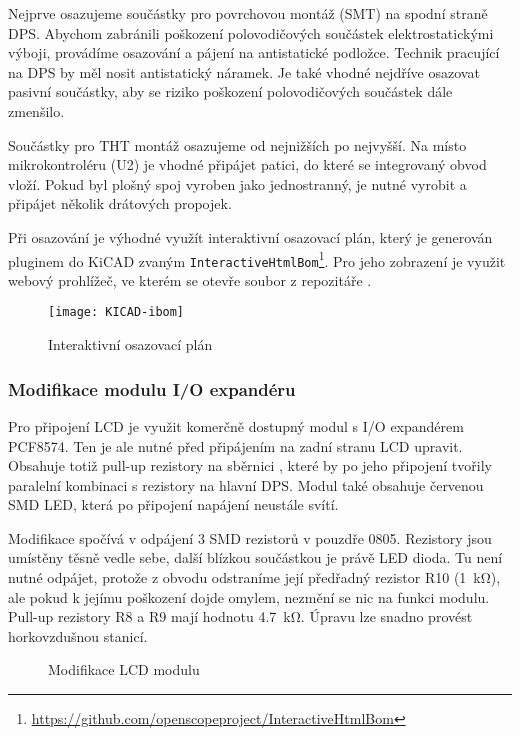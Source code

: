 Nejprve osazujeme součástky pro povrchovou montáž (SMT) na spodní straně DPS.
Abychom zabránili poškození polovodičových součástek elektrostatickými výboji,
provádíme osazování a pájení na antistatické podložce. Technik pracující na DPS
by měl nosit antistatický náramek. Je také vhodné nejdříve osazovat pasivní
součástky, aby se riziko poškození polovodičových součástek dále zmenšilo.

Součástky pro THT montáž osazujeme od nejnižších po nejvyšší. Na místo
mikrokontroléru (U2) je vhodné připájet patici, do které se integrovaný obvod
vloží. Pokud byl plošný spoj vyroben jako jednostranný, je nutné vyrobit
a připájet několik drátových propojek.

Při osazování je výhodné využít interaktivní osazovací plán, který je generován
pluginem do KiCAD zvaným
\texttt{InteractiveHtmlBom}\footnote{\url{https://github.com/openscopeproject/InteractiveHtmlBom}}.
Pro jeho zobrazení je využit webový prohlížeč, ve kterém se otevře soubor
 z repozitáře .

\begin{figure}[htbp]
    \centering
    \texttt{[image: KICAD-ibom]}
    \caption{Interaktivní osazovací plán}
    \label{fig:PCB ibom}
\end{figure}


\subsubsection{Modifikace modulu I/O expandéru}
Pro připojení LCD je využit komerčně dostupný modul s I/O expandérem PCF8574.
Ten je ale nutné před připájením na zadní stranu LCD upravit. Obsahuje totiž
pull-up rezistory na sběrnici \IIC{}, které by po jeho připojení tvořily
paralelní kombinaci s rezistory na hlavní DPS. Modul také obsahuje červenou SMD
LED, která po připojení napájení neustále svítí.

Modifikace spočívá v odpájení 3 SMD rezistorů v pouzdře 0805. Rezistory jsou
umístěny těsně vedle sebe, další blízkou součástkou je právě LED dioda. Tu není
nutné odpájet, protože z obvodu odstraníme její předřadný rezistor R10
(\SI{1}{\kilo\ohm}), ale pokud k jejímu poškození dojde omylem, nezmění se nic
na funkci modulu. Pull-up rezistory R8 a R9 mají hodnotu \SI{4,7}{\kilo\ohm}.
Úpravu lze snadno provést horkovzdušnou stanicí.

\begin{figure}[htbp]
    \centering
    \caption{Modifikace LCD modulu}
    \label{fig:PCB LCD modul modifikace}
\end{figure}


